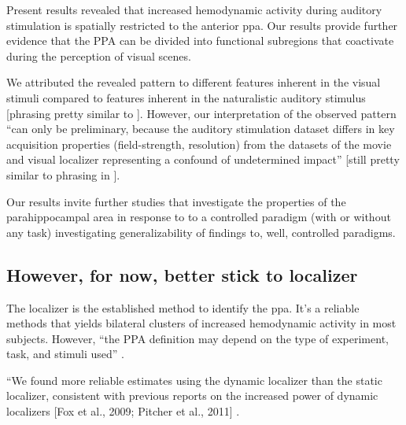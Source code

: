 %
Present results revealed that increased hemodynamic activity during auditory
stimulation is spatially restricted to the anterior \ac{ppa}.
Our results provide further evidence that the PPA can be divided into functional
subregions that coactivate during the perception of visual scenes.

%
We attributed the revealed pattern to different features inherent in the visual
stimuli compared to features inherent in the naturalistic auditory stimulus
[phrasing pretty similar to \citep{haeusler2022processing}].
%
However, our interpretation of the observed pattern ``can only be preliminary,
because the auditory stimulation dataset differs in key acquisition properties
(field-strength, resolution) from the datasets of the movie and visual localizer
representing a confound of undetermined impact'' [still pretty similar to
phrasing in \citep{haeusler2022processing}].

%
Our results invite further studies that investigate the properties of the
parahippocampal area in response to to a controlled paradigm (with or without
any task) investigating generalizability of findings to, well, controlled
paradigms.


\subsection{However, for now, better stick to localizer}



%
The localizer is the established method to identify the \ac{ppa}.
It's a reliable methods that yields bilateral clusters of increased hemodynamic
activity in most subjects.
%
However, ``the PPA definition may depend on the type of experiment, task, and
stimuli used'' \citep{weiner2018defining}.


%
``We found more reliable estimates using the dynamic localizer than the static
localizer, consistent with previous reports on the increased power of dynamic
localizers [Fox et al., 2009; Pitcher et al., 2011]
\citep{jiahui2020predicting}.

